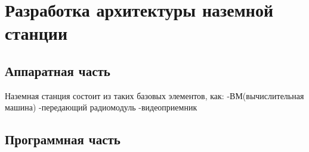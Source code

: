 
\section{Разработка архитектуры наземной станции}
\subsection{Аппаратная часть}
Наземная станция состоит из таких базовых элементов, как:
-ВМ(вычислительная машина)
-передающий радиомодуль
-видеоприемник



\subsection{Программная часть}
